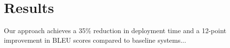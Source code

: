  
\section{Results}
Our approach achieves a 35\% reduction in deployment time and a 12-point improvement in BLEU scores compared to baseline systems...